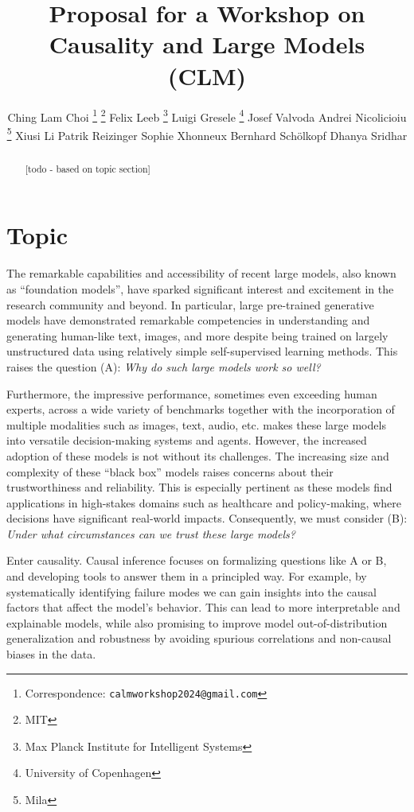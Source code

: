 \documentclass{article}
\title{Proposal for a Workshop on \\
Causality and Large Models (C\emoji{heart}LM)}
\author{%
    Ching Lam Choi \thanks{Correspondence: \texttt{calmworkshop2024@gmail.com}} \thanks{MIT}
    \And
    Felix Leeb \footnotemark[1] \thanks{Max Planck Institute for Intelligent Systems}
    \And
    Luigi Gresele \thanks{University of Copenhagen}
    \And
    Josef Valvoda \footnotemark[4]
    \And
    Andrei Nicolicioiu \thanks{Mila}
    \And
    Xiusi Li \footnotemark[5]
    \And
    Patrik Reizinger \footnotemark[3]
    \And
    Sophie Xhonneux \footnotemark[5]
    \And
    Bernhard Schölkopf \footnotemark[3]
    \And
    Dhanya Sridhar \footnotemark[5]
}
\begin{document}
\maketitle


\begin{abstract}
[todo - based on topic section]
\end{abstract}



\section{Topic}

The remarkable capabilities and accessibility of recent large models, also known as ``foundation models'', have sparked significant interest and excitement in the research community and beyond. In particular, large pre-trained generative models have demonstrated remarkable competencies in understanding and generating human-like text, images, and more despite being trained on largely unstructured data using relatively simple self-supervised learning methods. This raises the question (A): \textit{Why do such large models work so well?} %

Furthermore, the impressive performance, sometimes even exceeding human experts, across a wide variety of benchmarks together with the incorporation of multiple modalities such as images, text, audio, etc. makes these large models into versatile decision-making systems and agents.
However, the increased adoption of these models is not without its challenges. The increasing size and complexity of these ``black box'' models raises concerns about their trustworthiness and reliability.
This is especially pertinent as these models find applications in high-stakes domains such as healthcare and policy-making, where decisions have significant real-world impacts.
Consequently, we must consider (B): \textit{Under what circumstances can we trust these large models?} %

Enter causality. Causal inference focuses on formalizing questions like A or B, and developing tools to answer them in a principled way. For example, by systematically identifying failure modes 
we can gain insights into the causal factors that affect the model's behavior. 
This can lead to more interpretable and explainable models, while also promising to improve model out-of-distribution generalization and robustness by avoiding spurious correlations and non-causal biases in the data.
\end{document}

